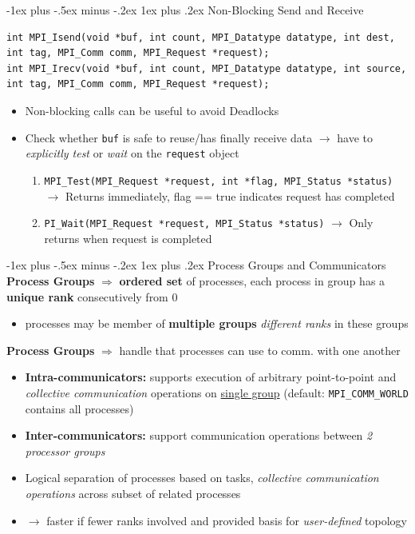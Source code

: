 \documentclass[10pt,landscape]{article}
\makeatletter
\renewcommand{\subsubsection}{\@startsection{subsubsection}{3}{0mm}%
                                {-1ex plus -.5ex minus -.2ex}%
                                {1ex plus .2ex}%
                                {\normalfont\small\bfseries}}
\newcommand{\subsubsubsection}{\@startsection{subsubsection}{3}{0mm}%
                                {-1ex plus -.5ex minus -.2ex}%
                                {1ex plus .2ex}%
                                {\normalfont\scriptsize\bfseries}}
\makeatother
\begin{document}
\begin{multicols*}{3}
\subsubsubsection{Non-Blocking Send and Receive}
\begin{lstlisting}[basicstyle = \tiny\ttfamily]
int MPI_Isend(void *buf, int count, MPI_Datatype datatype, int dest, int tag, MPI_Comm comm, MPI_Request *request);
int MPI_Irecv(void *buf, int count, MPI_Datatype datatype, int source, int tag, MPI_Comm comm, MPI_Request *request);
\end{lstlisting}
\begin{itemize}[topsep=0pt,noitemsep,wide=0pt, leftmargin=\dimexpr{} + 2\relax]
    \item Non-blocking calls can be useful to avoid Deadlocks
    \item Check whether \verb|buf| is safe to reuse/has finally receive data $\rightarrow$ have to \textit{explicitly test} or \textit{wait} on the \verb|request| object
    \begin{enumerate}[topsep=0pt,noitemsep,wide=0pt, leftmargin=\dimexpr\labelwidth + 2\labelsep\relax]
        \item \verb|MPI_Test(MPI_Request *request, int *flag, MPI_Status *status)| $\rightarrow$ Returns immediately, flag == true indicates request has completed
        \item \verb|PI_Wait(MPI_Request *request, MPI_Status *status)| $\rightarrow$ Only returns when request is completed
    \end{enumerate}
\end{itemize}

\subsubsection{Process Groups and Communicators}
\textbf{Process Groups} $\Rightarrow$ \textbf{ordered set} of processes, each process in group has a \textbf{unique rank} consecutively from $0$
\begin{itemize}[topsep=0pt,noitemsep,wide=0pt, leftmargin=\dimexpr{} + 2\relax]
    \item processes may be member of \textbf{multiple groups} \textit{different ranks} in these groups
\end{itemize}

\textbf{Process Groups} $\Rightarrow$ handle that processes can use to comm. with one another
\begin{itemize}[topsep=0pt,noitemsep,wide=0pt, leftmargin=\dimexpr{} + 2\relax]
    \item \textbf{Intra-communicators:} supports execution of arbitrary point-to-point and \textit{collective communication} operations on \underline{single group} (default: \verb|MPI_COMM_WORLD| contains all processes)
    \item \textbf{Inter-communicators:} support communication operations between \textit{2 processor groups}
    \item Logical separation of processes based on tasks, \textit{collective communication operations} across subset of related processes 
    \item $\rightarrow$ faster if fewer ranks involved and provided basis for \textit{user-defined} topology
\end{itemize}


\end{multicols*}
\end{document}
